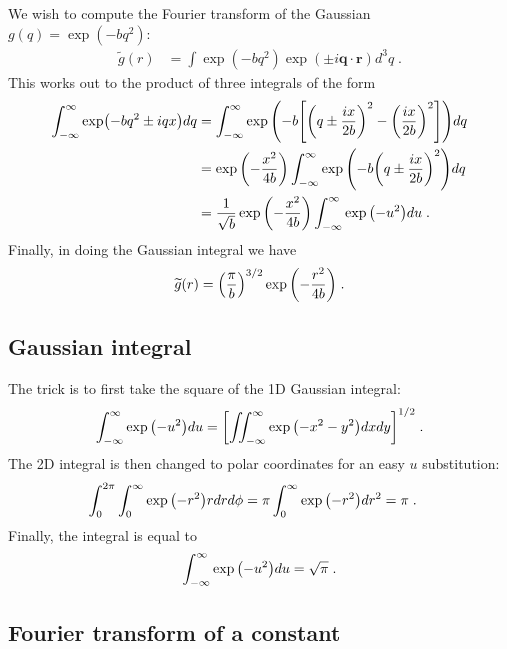 \documentclass[11pt]{article}
\renewcommand{\vec}[1]{\boldsymbol{#1}}
\begin{document}
We wish to compute the Fourier transform of the Gaussian $g(q) = \exp(-b q^2)$:
\begin{align}
\widetilde g(r) &=  \int \exp(-b q^2) \exp(\pm i \vec q \cdot \vec r) d^3q \;.
\end{align}
This works out to the product of three integrals of the form
\begin{align}
\int_{-\infty}^\infty \exp(-b q^2 \pm i q x)dq &= \int_{-\infty}^\infty \exp\qty(-b \qty[\qty(q \pm \frac{i x}{2b} )^2 - \qty(\frac{i x}{2b})^2] )dq  \\
&= \exp\qty(-\frac{x^2}{4b})\int_{-\infty}^\infty \exp\qty(-b \qty(q \pm \frac{i x}{2b} )^2  )dq \\
&= \frac{1}{\sqrt{b}}\exp\qty(-\frac{x^2}{4b})\int_{-\infty}^\infty \exp\qty( -u^2  )du \;.
\end{align}
Finally, in doing the Gaussian integral we have
\begin{align}
\widetilde g(r) = \qty(\frac{\pi}{b})^{3/2}\exp\qty(-\frac{r^2}{4b}) \;.
\end{align}


\subsection{Gaussian integral}
\label{sec:gaussianint}

The trick is to first take the square of the 1D Gaussian integral:
\begin{align}
\int_{-\infty}^\infty \exp\qty( -u^2  )du = \qty[ \iint_{-\infty}^\infty \exp\qty( -x^2-y^2  )dxdy ]^{1/2} \;.
\end{align}
The 2D integral is then changed to polar coordinates for an easy $u$ substitution:
\begin{align}
\int_0^{2\pi} \int_0^\infty \exp\qty( -r^2  ) r dr d\phi &= \pi \int_0^\infty \exp\qty( -r^2  ) d r^2 = \pi \;.
\end{align}
Finally, the integral is equal to 
\begin{align}
 \int_{-\infty}^\infty \exp\qty( -u^2  )du = \sqrt{\pi} \;.
\end{align}

\subsection{Fourier transform of a constant}
\label{sec:ftconst}
\end{document}
